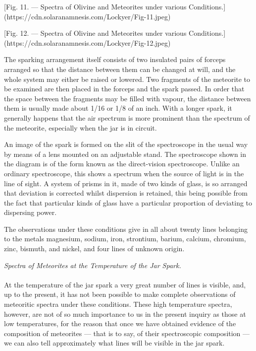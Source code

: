 \documentclass[a4paper, 12pt, oneside, polutonikogreek, english]{article}
\begin{document}
[Fig. 11. --- Spectra of Olivine and Meteorites under various Conditions.](https://cdn.solaranamnesis.com/Lockyer/Fig-11.jpeg)

[Fig. 12. --- Spectra of Olivine and Meteorites under various Conditions.](https://cdn.solaranamnesis.com/Lockyer/Fig-12.jpeg)

The sparking arrangement itself consists of two insulated pairs of forceps arranged so that the distance between them can be changed at will, and the whole system may either be raised or lowered. Two fragments of the meteorite to be examined are then placed in the forceps and the spark passed. In order that the space between the fragments may be filled with vapour, the distance between them is usually made about 1/16 or 1/8 of an inch. With a longer spark, it generally happens that the air spectrum is more prominent than the spectrum of the meteorite, especially when the jar is in circuit.

An image of the spark is formed on the slit of the spectroscope in the usual way by means of a lens mounted on an adjustable stand. The spectroscope shown in the diagram is of the form known as the direct-vision spectroscope. Unlike an ordinary spectroscope, this shows a spectrum when the source of light is in the line of sight. A system of prisms in it, made of two kinds of glass, is so arranged that deviation is corrected whilst dispersion is retained, this being possible from the fact that particular kinds of glass have a particular proportion of deviating to dispersing power.

The observations under these conditions give in all about twenty lines belonging to the metals magnesium, sodium, iron, strontium, barium, calcium, chromium, zinc, bismuth, and nickel, and four lines of unknown origin.
\begin{center}
\emph{Spectra of Meteorites at the Temperature of the Jar Spark.}
\end{center}
\paragraph{}
At the temperature of the jar spark a very great number of lines is visible, and, up to the present, it has not been possible to make complete observations of meteoritic spectra under these conditions. These high temperature spectra, however, are not of so much importance to us in the present inquiry as those at low temperatures, for the reason that once we have obtained evidence of the composition of meteorites --- that is to say, of their spectroscopic composition --- we can also tell approximately what lines will be visible in the jar spark.
\end{document}
